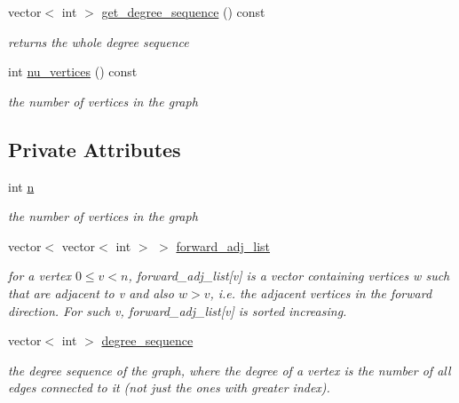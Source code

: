 \begin{DoxyCompactItemize}
vector$<$ int $>$ \hyperlink{classgraph_afdca627df7fb93a7d1d8a547f616e948}{get\+\_\+degree\+\_\+sequence} () const
\begin{DoxyCompactList}\small\item\em returns the whole degree sequence \end{DoxyCompactList}\item 
int \hyperlink{classgraph_a70a6e0e4e0a874ab122405abd38f83cd}{nu\+\_\+vertices} () const
\begin{DoxyCompactList}\small\item\em the number of vertices in the graph \end{DoxyCompactList}\end{DoxyCompactItemize}
\subsection*{Private Attributes}
\begin{DoxyCompactItemize}
\item 
int \hyperlink{classgraph_ac8b3474ce95c04087c312508ec1443b6}{n}
\begin{DoxyCompactList}\small\item\em the number of vertices in the graph \end{DoxyCompactList}\item 
vector$<$ vector$<$ int $>$ $>$ \hyperlink{classgraph_a7d6441850d586d6a99fb73df57b70362}{forward\+\_\+adj\+\_\+list}
\begin{DoxyCompactList}\small\item\em for a vertex $0 \leq v < n$, forward\+\_\+adj\+\_\+list\mbox{[}v\mbox{]} is a vector containing vertices w such that are adjacent to v and also $w > v$, i.\+e. the adjacent vertices in the forward direction. For such v, forward\+\_\+adj\+\_\+list\mbox{[}v\mbox{]} is sorted increasing. \end{DoxyCompactList}\item 
vector$<$ int $>$ \hyperlink{classgraph_a0b31295672bfe37669c9eb3640977fe6}{degree\+\_\+sequence}
\begin{DoxyCompactList}\small\item\em the degree sequence of the graph, where the degree of a vertex is the number of all edges connected to it (not just the ones with greater index). \end{DoxyCompactList}\end{DoxyCompactItemize}
